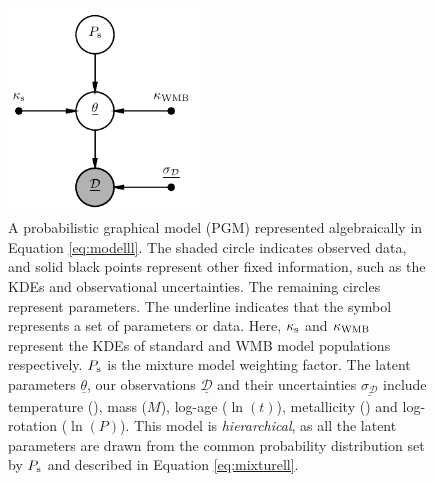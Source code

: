 \begin{figure}
	\centering
	\includegraphics[width=0.45\textwidth]{pgm_models.pdf}
	\caption{A probabilistic graphical model (PGM) represented algebraically in Equation \ref{eq:modelll}. The shaded circle indicates observed data, and solid black points represent other fixed information, such as the KDEs and observational uncertainties. The remaining circles represent parameters. The underline indicates that the symbol represents a set of parameters or data. Here, $\kappa_{\rm{s}}$ and $\kappa_{\rm WMB}$ represent the KDEs of standard and WMB model populations respectively. $P_{\rm{s}}$ is the mixture model weighting factor. The latent parameters $\underline{\theta}$, our observations $\underline{\mathcal{D}}$ and their uncertainties $\underline{\sigma_{\mathcal{D}}}$ include temperature (\teff), mass ($M$), log-age ($\ln(t)$), metallicity (\feh) and log-rotation ($\ln(P)$). This model is \textit{hierarchical}, as all the latent parameters are drawn from the common probability distribution set by $P_{\rm{s}}$ and described in Equation \ref{eq:mixturell}.}
	\label{fig:pgm}
\end{figure}

